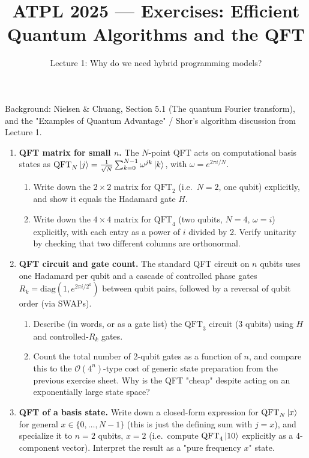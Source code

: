 \documentclass[11pt]{article}
\title{ATPL 2025 --- Exercises: Efficient Quantum Algorithms and the QFT}
\author{Lecture 1: Why do we need hybrid programming models?}
\date{}
\begin{document}
\maketitle

Background: Nielsen \& Chuang, Section 5.1 (The quantum Fourier
transform), and the "Examples of Quantum Advantage" / Shor's algorithm
discussion from Lecture 1.

\begin{enumerate}[label=\textbf{Exercise \arabic*.}, leftmargin=2.2cm]

\item \textbf{QFT matrix for small $n$.}
The $N$-point QFT acts on computational basis states as
$\mathrm{QFT}_N \ket{j} = \frac1{\sqrt N}\sum_{k=0}^{N-1}
\omega^{jk}\ket{k}$, with $\omega = e^{2\pi i/N}$.
\begin{enumerate}[label=(\alph*)]
\item Write down the $2\times2$ matrix for $\mathrm{QFT}_2$ (i.e.\ $N=2$,
one qubit) explicitly, and show it equals the Hadamard gate $H$.
\item Write down the $4\times4$ matrix for $\mathrm{QFT}_4$ (two qubits,
$N=4$, $\omega = i$) explicitly, with each entry as a power of $i$
divided by 2. Verify unitarity by checking that two different columns
are orthonormal.
\end{enumerate}

\item \textbf{QFT circuit and gate count.}
The standard QFT circuit on $n$ qubits uses one Hadamard per qubit and a
cascade of controlled phase gates $R_k = \mathrm{diag}(1,
e^{2\pi i/2^k})$ between qubit pairs, followed by a reversal of qubit
order (via SWAPs).
\begin{enumerate}[label=(\alph*)]
\item Describe (in words, or as a gate list) the $\mathrm{QFT}_3$
circuit (3 qubits) using $H$ and controlled-$R_k$ gates.
\item Count the total number of 2-qubit gates as a function of $n$, and
compare this to the $\mathcal O(4^n)$-type cost of generic state
preparation from the previous exercise sheet. Why is the QFT "cheap"
despite acting on an exponentially large state space?
\end{enumerate}

\item \textbf{QFT of a basis state.}
Write down a closed-form expression for $\mathrm{QFT}_N\ket{x}$ for
general $x \in \{0,\dots,N-1\}$ (this is just the defining sum with
$j=x$), and specialize it to $n=2$ qubits, $x=2$ (i.e.\ compute
$\mathrm{QFT}_4\ket{10}$ explicitly as a 4-component vector). Interpret
the result as a "pure frequency $x$" state.


\end{enumerate}
\end{document}
